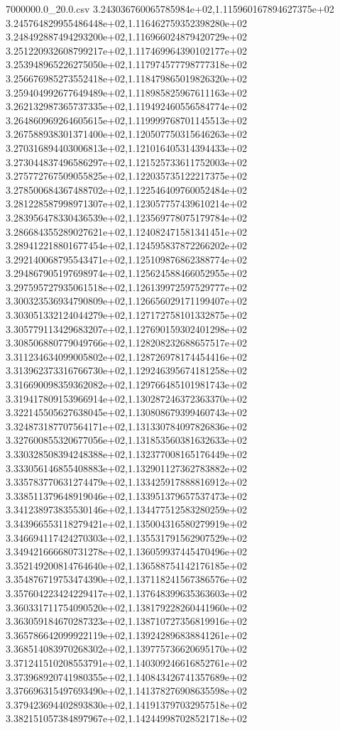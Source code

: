 \begin{filecontents*}{7000000.0_20.0.csv}
3.243036760065785984e+02,1.115960167894627375e+02
3.245764829955486448e+02,1.116462759352398280e+02
3.248492887494293200e+02,1.116966024879420729e+02
3.251220932608799217e+02,1.117469964390102177e+02
3.253948965226275050e+02,1.117974577798777318e+02
3.256676985273552418e+02,1.118479865019826320e+02
3.259404992677649489e+02,1.118985825967611163e+02
3.262132987365737335e+02,1.119492460556584774e+02
3.264860969264605615e+02,1.119999768701145513e+02
3.267588938301371400e+02,1.120507750315646263e+02
3.270316894403006813e+02,1.121016405314394433e+02
3.273044837496586297e+02,1.121525733611752003e+02
3.275772767509055825e+02,1.122035735122217375e+02
3.278500684367488702e+02,1.122546409760052484e+02
3.281228587998971307e+02,1.123057757439610214e+02
3.283956478330436539e+02,1.123569778075179784e+02
3.286684355289027621e+02,1.124082471581341451e+02
3.289412218801677454e+02,1.124595837872266202e+02
3.292140068795543471e+02,1.125109876862388774e+02
3.294867905197698974e+02,1.125624588466052955e+02
3.297595727935061518e+02,1.126139972597529777e+02
3.300323536934790809e+02,1.126656029171199407e+02
3.303051332124044279e+02,1.127172758101332875e+02
3.305779113429683207e+02,1.127690159302401298e+02
3.308506880779049766e+02,1.128208232688657517e+02
3.311234634099005802e+02,1.128726978174454416e+02
3.313962373316766730e+02,1.129246395674181258e+02
3.316690098359362082e+02,1.129766485101981743e+02
3.319417809153966914e+02,1.130287246372363370e+02
3.322145505627638045e+02,1.130808679399460743e+02
3.324873187707564171e+02,1.131330784097826836e+02
3.327600855320677056e+02,1.131853560381632633e+02
3.330328508394248388e+02,1.132377008165176449e+02
3.333056146855408883e+02,1.132901127362783882e+02
3.335783770631274479e+02,1.133425917888816912e+02
3.338511379648919046e+02,1.133951379657537473e+02
3.341238973835530146e+02,1.134477512583280259e+02
3.343966553118279421e+02,1.135004316580279919e+02
3.346694117424270303e+02,1.135531791562907529e+02
3.349421666680731278e+02,1.136059937445470496e+02
3.352149200814764640e+02,1.136588754142176185e+02
3.354876719753474390e+02,1.137118241567386576e+02
3.357604223424229417e+02,1.137648399635363603e+02
3.360331711754090520e+02,1.138179228260441960e+02
3.363059184670287323e+02,1.138710727356819916e+02
3.365786642099922119e+02,1.139242896838841261e+02
3.368514083970268302e+02,1.139775736620695170e+02
3.371241510208553791e+02,1.140309246616852761e+02
3.373968920741980355e+02,1.140843426741357689e+02
3.376696315497693490e+02,1.141378276908635598e+02
3.379423694402893830e+02,1.141913797032957518e+02
3.382151057384897967e+02,1.142449987028521718e+02

\end{filecontents*}

